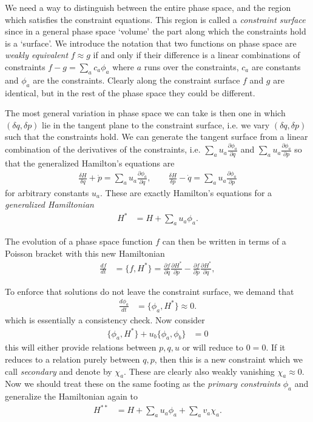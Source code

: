 \documentclass[notitlepage,amsmath,amssymb,aps, pra, 10pt]{revtex4-1}
\newcommand{\der}[2][]{\frac{d#1}{d#2}}
\newcommand{\pd}[2][]{\frac{\partial#1}{\partial#2}}
\newcommand{\vd}[2][]{\frac{\delta#1}{\delta#2}}
\begin{document}
     We need a way to distinguish between the entire phase space, and the region which satisfies the constraint equations. This region is called a \emph{constraint surface} since in a general phase space `volume' the part along which the constraints hold is a `surface'. We introduce the notation that two functions on phase space are \emph{weakly equivalent} $f \approx g$ if and only if their difference is a linear combinations of constraints $f-g = \sum_a c_a \phi_a$ where $a$ runs over the constraints, $c_a$ are constants and $\phi_a$ are the constraints. Clearly along the constraint surface $f$ and $g$ are identical, but in the rest of the phase space they could be different.

     The most general variation in phase space we can take is then one in which $(\delta q, \delta p)$ lie in the tangent plane to the constraint surface, i.e. we vary $(\delta q, \delta p)$ such that the constraints hold. We can generate the tangent surface from a linear combination of the derivatives of the constraints, i.e. $\sum_a u_a \pd[\phi_a]{q}$ and $\sum_a u_a \pd[\phi_a]{p}$ so that the generalized Hamilton's equations are
     \begin{align}
         \vd[H]{q} +\dot p =  \sum_a u_a \pd[\phi_a]{q}, \qquad \vd[H]{p} - \dot q = \sum_a u_a \pd[\phi_a]{p}
     \end{align}
     for arbitrary constants $u_a$. These are exactly Hamilton's equations for a \emph{generalized Hamiltonian}
     \begin{align}
         H^* &= H +  \sum_a u_a\phi_a.
     \end{align}

     The evolution of a phase space function $f$ can then be written in terms of a Poisson bracket with this new Hamiltonian
     \begin{align}
         \der[f]{t} &= \{f, H^* \} = \pd[f]{q}\pd[H^*]{p} - \pd[f]{p} \pd[H^*]{q},
     \end{align}

     To enforce that solutions do not leave the constraint surface, we demand that
     \begin{align}
         \der[\phi_a]{t} &= \{\phi_a, H^*\} \approx 0.
     \end{align}
    which is essentially a consistency check. Now consider
    \begin{align}
        \label{eq:Hpb}
        \{\phi_a, H^*\} + u_b\{\phi_a, \phi_b\} &= 0
    \end{align}
    this will either provide relations between $p, q, u$ or will reduce to $0=0$. If it reduces to a relation purely between $q, p$, then this is a new constraint which we call \emph{secondary} and denote by $\chi_a$. These are clearly also weakly vanishing $\chi_a\approx0$. Now we should treat these on the same footing as the \emph{primary constraints} $\phi_a$ and generalize the Hamiltonian again to
    \begin{align}
        H^{**} &= H +  \sum_{a} u_a\phi_a + \sum_{a} v_a \chi_a.
    \end{align}
\end{document}
